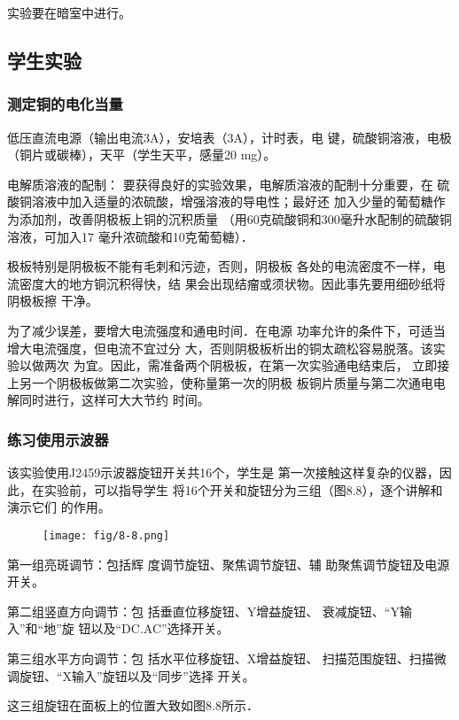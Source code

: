 实验要在暗室中进行。

\subsection{学生实验}
\subsubsection{测定铜的电化当量}
低压直流电源（输出电流3A），安培表（3A），计时表，电
键，硫酸铜溶液，电极（铜片或碳棒），天平（学生天平，感量20
mg）。

电解质溶液的配制：
要获得良好的实验效果，电解质溶液的配制十分重要，在
硫酸铜溶液中加入适量的浓硫酸，增强溶液的导电性；最好还
加入少量的葡萄糖作为添加剂，改善阴极板上铜的沉积质量
（用60克硫酸铜和300毫升水配制的硫酸铜溶液，可加入17
毫升浓硫酸和10克葡萄糖）．

极板特别是阴极板不能有毛刺和污迹，否则，阴极板
各处的电流密度不一样，电流密度大的地方铜沉积得快，结
果会出现结瘤或须状物。因此事先要用细砂纸将阴极板擦
干净。

为了减少误差，要增大电流强度和通电时间．在电源
功率允许的条件下，可适当增大电流强度，但电流不宜过分
大，否则阴极板析出的铜太疏松容易脱落。该实验以做两次
为宜。因此，需准备两个阴极板，在第一次实验通电结束后，
立即接上另一个阴极板做第二次实验，使称量第一次的阴极
板铜片质量与第二次通电电解同时进行，这样可大大节约
时间。

\subsubsection{练习使用示波器}

该实验使用J2459示波器旋钮开关共16个，学生是
第一次接触这样复杂的仪器，因此，在实验前，可以指导学生
将16个开关和旋钮分为三组（图8.8），逐个讲解和演示它们
的作用。

\begin{figure}[htp]
    \centering
\texttt{[image: fig/8-8.png]}
    \caption{}
\end{figure}

第一组亮斑调节：包括辉
度调节旋钮、聚焦调节旋钮、辅
助聚焦调节旋钮及电源开关。

第二组竖直方向调节：包
括垂直位移旋钮、Y增益旋钮、
衰减旋钮、“Y输入”和“地”旋
钮以及“DC.AC”选择开关。

第三组水平方向调节：包
括水平位移旋钮、X增益旋钮、
扫描范围旋钮、扫描微调旋钮、“X输入”旋钮以及“同步”选择
开关。

这三组旋钮在面板上的位置大致如图8.8所示．

